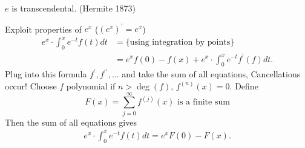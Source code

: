 \documentclass[NumTh.tex]{subfiles}
\begin{document}
\begin{theorem}
  $e$ is transcendental. (Hermite 1873)
\end{theorem}

Exploit properties of $e^x$ ($(e^x)^\prime = e^x$)
\begin{align*}
  e^x \cdot \int_0^x e^{-t} f(t) dt &= \{ \text{using integration by points} \} \\
  &= e^x f(0) - f(x) + e^x \cdot \int_0^x e^{-t} f^\prime(f) dt \text{.}
\end{align*}
Plug into this formula $f^\prime, f^{\prime \prime},\dots$ and take the sum of all equations, Cancellations occur!
Choose $f$ polynomial if $n > \deg(f)$, $f^{(n)}(x) = 0$.
Define
\[ F(x) = \sum_{j=0}^\infty f^{(j)}(x) \text{ is a finite sum} \]
Then the sum of all equations gives
\begin{align} \label{doublestar}
  e^x \cdot \int_0^x e^{-t} f(t) dt = e^x F(0) - F(x) \text{.}
\end{align}
\end{document}
